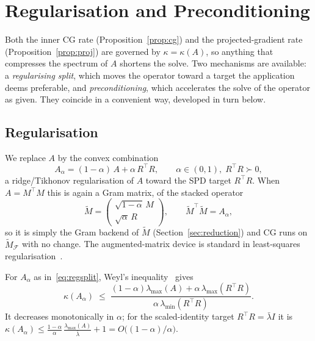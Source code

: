 \section{Regularisation and Preconditioning}\label{sec:conditioning}

Both the inner CG rate (Proposition~\ref{prop:cg}) and the projected-gradient rate
(Proposition~\ref{prop:proj}) are governed by $\kappa = \kappa(A)$, so anything that
compresses the spectrum of $A$ shortens the solve. Two mechanisms are available: a
\emph{regularising split}, which moves the operator toward a target the application deems
preferable, and \emph{preconditioning}, which accelerates the solve of the operator as given.
They coincide in a convenient way, developed in turn below.

\subsection{Regularisation}\label{ssec:reg}

We replace $A$ by the convex combination
\begin{equation}\label{eq:regsplit}
  A_\alpha = (1-\alpha)\,A + \alpha\,R^\top R, \qquad \alpha \in (0,1),\; R^\top R \succ 0,
\end{equation}
a ridge/Tikhonov regularisation of $A$ toward the SPD target $R^\top R$. When $A = M^\top M$
this is again a Gram matrix, of the stacked operator
\[
  \tilde{M} = \begin{pmatrix} \sqrt{1-\alpha}\,M \\ \sqrt{\alpha}\,R \end{pmatrix},
  \qquad \tilde{M}^\top\tilde{M} = A_\alpha,
\]
so it is simply the Gram backend of $\tilde M$ (Section~\ref{sec:reduction})
and CG runs on $\tilde{M}_{\mathcal{F}}$ with no change. The
augmented-matrix device is standard in least-squares
regularisation~\cite{golub2013,lawson1974}.

\begin{proposition}\label{prop:regcond}
  For $A_\alpha$ as in~\eqref{eq:regsplit}, Weyl's inequality~\cite{hornjohnson2013} gives
  \[
    \kappa(A_\alpha) \;\leq\;
    \frac{(1-\alpha)\lambda_{\max}(A) + \alpha\,\lambda_{\max}(R^\top R)}
         {\alpha\,\lambda_{\min}(R^\top R)}.
  \]
  It decreases monotonically in $\alpha$; for the scaled-identity target
  $R^\top R = \bar\lambda I$ it is
  $\kappa(A_\alpha) \le \tfrac{1-\alpha}{\alpha}\,\tfrac{\lambda_{\max}(A)}{\bar\lambda} + 1
  = O\!\big((1-\alpha)/\alpha\big)$.
\end{proposition}


